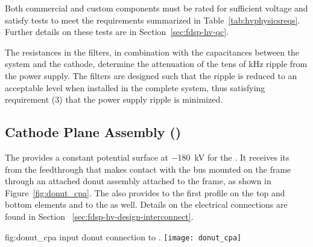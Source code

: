 Both commercial and custom  components must be rated for sufficient voltage and satisfy tests to meet the requirements summarized in Table~\ref{tab:hvphysicsreqs}.  Further details on these tests are in Section~\ref{sec:fdsp-hv-qc}.

The resistances in the filters, in combination with the capacitances between the  system and the cathode,
 determine the attenuation of the tens of \si{\kilo\hertz} ripple from the power supply.  The filters %
are designed such that the ripple is reduced to an acceptable level when installed in the complete system, thus satisfying requirement (3) that the power supply ripple is minimized.

\subsection{Cathode Plane Assembly ()}

The  provides a constant potential surface at \SI{-180}{\kV} for the .  It receives its  from the feedthrough that makes contact with the  bus mounted on the  frame through an attached donut assembly attached to the frame, as shown in Figure~\ref{fig:donut_cpa}. %
The  also provides  to the first profile on the top and bottom  elements and to the  as well. %
Details on the electrical connections are found in Section ~\ref{sec:fdsp-hv-design-interconnect}.

\begin{dunefigure}{fig:donut_cpa}{ input donut connection to .}
\texttt{[image: donut\_cpa]} %
\end{dunefigure}

